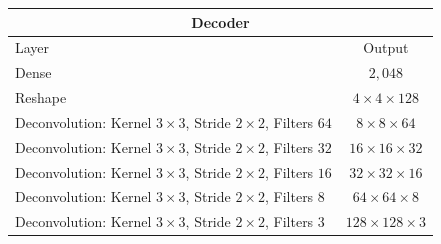 \begin{center}
    \begin{table}[H]
        \centering
        \begin{tabular}{ | l | c | }
            \multicolumn{2}{c}{Decoder} \\ \hline
            Layer & Output\\ \hline
            Dense                                                                   & $2,048$                   \\
            Reshape                                                                 & $4\times 4\times    128$  \\
            Deconvolution: Kernel $3\times3$, Stride $2\times2$, Filters $64 $      & $8\times 8\times    64 $  \\
            Deconvolution: Kernel $3\times3$, Stride $2\times2$, Filters $32 $      & $16\times 16\times  32 $  \\
            Deconvolution: Kernel $3\times3$, Stride $2\times2$, Filters $16 $      & $32\times 32\times  16 $  \\
            Deconvolution: Kernel $3\times3$, Stride $2\times2$, Filters $8  $      & $64\times 64\times  8  $  \\
            Deconvolution: Kernel $3\times3$, Stride $2\times2$, Filters $3  $      & $128\times 128\times3  $  \\
            \hline
        \end{tabular} 
    \end{table}
\end{center}

\vspace{-3em}

